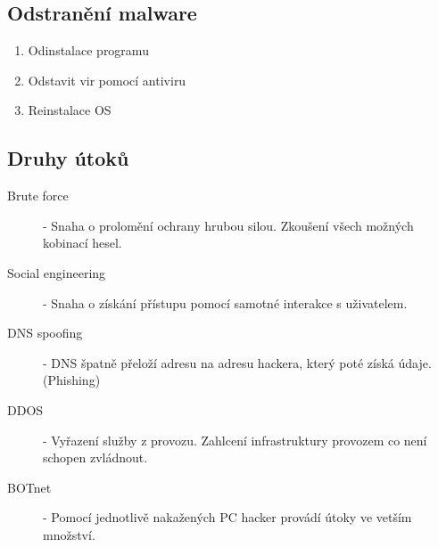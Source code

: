 \subsection{Odstranění malware}
\begin{enumerate}
  \item Odinstalace programu
  \item Odstavit vir pomocí antiviru
  \item Reinstalace OS
\end{enumerate}
\subsection{Druhy útoků}
\begin{description}
  \item[Brute force]- Snaha o prolomění ochrany hrubou silou. Zkoušení všech možných kobinací hesel. 
  \item[Social engineering]- Snaha o získání přístupu pomocí samotné interakce s uživatelem.
  \item[DNS spoofing]- DNS špatně přeloží adresu na adresu hackera, který poté získá údaje. (Phishing)
  \item[DDOS]- Vyřazení služby z provozu. Zahlcení infrastruktury provozem co není schopen zvládnout.
  \item[BOTnet]- Pomocí jednotlivě nakažených PC hacker provádí útoky ve vetším množství.
\end{description}